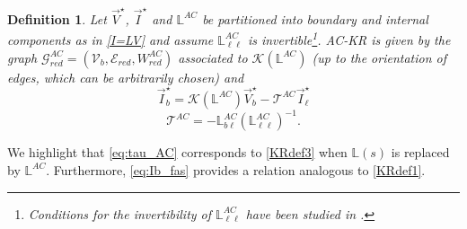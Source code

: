 \documentclass[a4paper]{article}
\theoremstyle{plain}
\newtheorem{defn}{Definition}
\def\Lset{\mathbb{L}}
\newcommand{\EE}{{\mathcal E}}
\newcommand{\GG}{{\mathcal G}}
\newcommand{\KK}{{\mathcal K}}
\newcommand{\T}{{\mathcal T}}
\newcommand{\VV}{{\mathcal V}}
\begin{document}
\begin{defn}
\label{def:AC-KR}
Let  $\vec{V}^{\star}$, $\vec{I}^{\star}$ and $\Lset^{AC}$ be partitioned into boundary and internal components as in \eqref{I=LV} and assume $\Lset_{\ell\ell}^{AC}$ is invertible\footnote{Conditions for the invertibility of $\Lset_{\ell\ell}^{AC}$ have been studied in \cite{luo2014spatiotemporal}.}. AC-KR is given by the graph $\GG_{red}^{AC}=\left( \VV_b, \EE_{red}, W_{red}^{AC} \right)$ associated to $\KK(\Lset^{AC})$ (up to the orientation of edges, which can be arbitrarily chosen) and
\begin{equation}
\label{eq:Ib_fas}
\vec{I}^{\star}_b = \KK(\Lset^{AC}) \vec{V}^{\star}_b-\T^{AC}\vec{I}^{\star}_{\ell} 
\end{equation}
\begin{equation}
\label{eq:tau_AC}
\T^{AC} = -\Lset_{b\ell}^{AC}(\Lset^{AC}_{\ell\ell})^{-1}.
\end{equation}
\end{defn}
We highlight that \eqref{eq:tau_AC} corresponds to \eqref{KRdef3} when $\Lset(s)$ is replaced by $\Lset^{AC}$. Furthermore, \eqref{eq:Ib_fas} provides a relation analogous to \eqref{KRdef1}.
\end{document}
